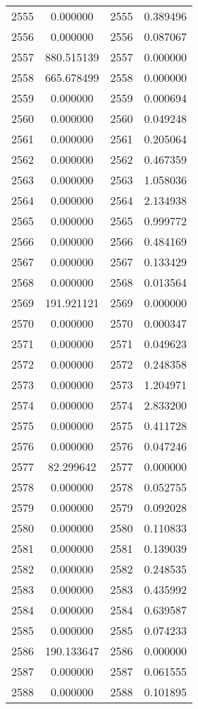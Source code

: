 \documentclass[12pt]{article}
\begin{document}
\begin{longtable}{@{}cccc@{}}
2555 & 0.000000 & 2555 & 0.389496 \\
2556 & 0.000000 & 2556 & 0.087067 \\
2557 & 880.515139 & 2557 & 0.000000 \\
2558 & 665.678499 & 2558 & 0.000000 \\
2559 & 0.000000 & 2559 & 0.000694 \\
2560 & 0.000000 & 2560 & 0.049248 \\
2561 & 0.000000 & 2561 & 0.205064 \\
2562 & 0.000000 & 2562 & 0.467359 \\
2563 & 0.000000 & 2563 & 1.058036 \\
2564 & 0.000000 & 2564 & 2.134938 \\
2565 & 0.000000 & 2565 & 0.999772 \\
2566 & 0.000000 & 2566 & 0.484169 \\
2567 & 0.000000 & 2567 & 0.133429 \\
2568 & 0.000000 & 2568 & 0.013564 \\
2569 & 191.921121 & 2569 & 0.000000 \\
2570 & 0.000000 & 2570 & 0.000347 \\
2571 & 0.000000 & 2571 & 0.049623 \\
2572 & 0.000000 & 2572 & 0.248358 \\
2573 & 0.000000 & 2573 & 1.204971 \\
2574 & 0.000000 & 2574 & 2.833200 \\
2575 & 0.000000 & 2575 & 0.411728 \\
2576 & 0.000000 & 2576 & 0.047246 \\
2577 & 82.299642 & 2577 & 0.000000 \\
2578 & 0.000000 & 2578 & 0.052755 \\
2579 & 0.000000 & 2579 & 0.092028 \\
2580 & 0.000000 & 2580 & 0.110833 \\
2581 & 0.000000 & 2581 & 0.139039 \\
2582 & 0.000000 & 2582 & 0.248535 \\
2583 & 0.000000 & 2583 & 0.435992 \\
2584 & 0.000000 & 2584 & 0.639587 \\
2585 & 0.000000 & 2585 & 0.074233 \\
2586 & 190.133647 & 2586 & 0.000000 \\
2587 & 0.000000 & 2587 & 0.061555 \\
2588 & 0.000000 & 2588 & 0.101895 \\

\end{longtable}
\end{document}
